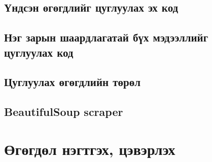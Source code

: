 \subsection{Үндсэн өгөгдлийг цуглуулах эх код}

\subsection{Нэг зарын шаардлагатай бүх мэдээллийг цуглуулах код}

\subsection{Цуглуулах өгөгдлийн төрөл}

\subsection{BeautifulSoup scraper}

\section{Өгөгдөл нэгтгэх, цэвэрлэх}
